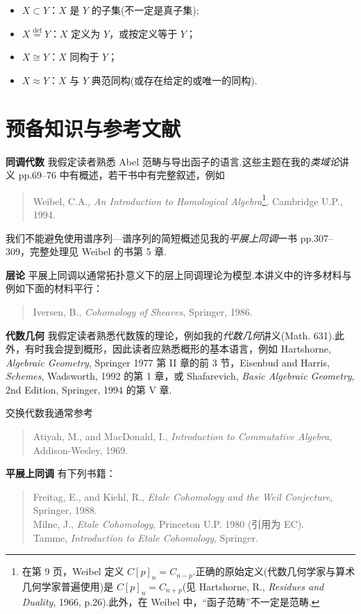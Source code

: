 \begin{itemize}
  \item $X \subset Y$：$X$ 是 $Y$ 的子集(不一定是真子集);
  \item $X \overset{\mathrm{def}}{=} Y$：$X$ 定义为 $Y$，或按定义等于 $Y$；
  \item $X \cong Y$：$X$ 同构于 $Y$；
  \item $X \approx Y$：$X$ 与 $Y$ 典范同构(或存在给定的或唯一的同构).
\end{itemize}

\chapter*{预备知识与参考文献}

\textbf{同调代数} 我假定读者熟悉 Abel 范畴与导出函子的语言.这些主题在我的\emph{类域论}讲义 pp.69--76 中有概述，若干书中有完整叙述，例如
\begin{quote}
  Weibel, C.A., \emph{An Introduction to Homological Algebra}\footnote{在第 9 页，Weibel 定义 $C[p]_n = C_{n-p}$.正确的原始定义(代数几何学家与算术几何学家普遍使用)是 $C[p]_n = C_{n+p}$(见 Hartshorne, R., \emph{Residues and Duality}, 1966, p.26).此外，在 Weibel 中，``函子范畴''不一定是范畴.}, Cambridge U.P., 1994.
\end{quote}
我们不能避免使用谱序列---谱序列的简短概述见我的\emph{平展上同调}一书 pp.307--309，完整处理见 Weibel 的书第 5 章.

\textbf{层论} 平展上同调以通常拓扑意义下的层上同调理论为模型.本讲义中的许多材料与例如下面的材料平行：
\begin{quote}
  Iversen, B., \emph{Cohomology of Sheaves}, Springer, 1986.
\end{quote}

\textbf{代数几何} 我假定读者熟悉代数簇的理论，例如我的\emph{代数几何}讲义(Math. 631).此外，有时我会提到概形，因此读者应熟悉概形的基本语言，例如 Hartshorne, \emph{Algebraic Geometry}, Springer 1977 第 II 章的前 3 节，Eisenbud and Harris, \emph{Schemes}, Wadsworth, 1992 的第 1 章，或 Shafarevich, \emph{Basic Algebraic Geometry}, 2nd Edition, Springer, 1994 的第 V 章.

交换代数我通常参考
\begin{quote}
  Atiyah, M., and MacDonald, I., \emph{Introduction to Commutative Algebra}, Addison-Wesley, 1969.
\end{quote}

\textbf{平展上同调} 有下列书籍：
\begin{quote}
  Freitag, E., and Kiehl, R., \emph{Etale Cohomology and the Weil Conjecture}, Springer, 1988.\\
  Milne, J., \emph{Etale Cohomology}, Princeton U.P. 1980 (引用为 EC).\\
  Tamme, \emph{Introduction to Etale Cohomology}, Springer.
\end{quote}

